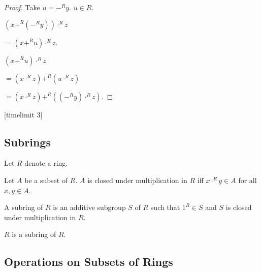 \documentclass[11pt]{article}
\begin{document}
\begin{forthel}
\begin{proof} 
Take $u = -^{R} y$. $u \in R$.

$(x +^{R} (-^{R} y)) \cdot^{R} z $

$= (x +^{R} u) \cdot^{R} z $.

$(x +^{R} u) \cdot^{R} z $


$= (x \cdot^{R} z) +^{R} (u \cdot^{R} z)$


$= (x \cdot^{R} z) +^{R} ((-^{R} y) \cdot^{R} z)$.


\end{proof}
[timelimit 3]
\end{forthel}

\subsection{Subrings}
\begin{forthel}

Let $R$ denote a ring. 

\begin{definition} Let $A$ be a subset of $R$. $A$ is closed under
multiplication in $R$ iff $x \cdot^{R} y \in A$ for all $x,y \in A$.
\end{definition}


\begin{definition} A subring of $R$ is an additive subgroup $S$ of $R$ such that
$1^{R} \in S$ and $S$ is closed under multiplication in $R$.
\end{definition}

\begin{lemma} $R$ is a subring of $R$. \end{lemma}

\end{forthel}

\subsection{Operations on Subsets of Rings}
\renewcommand{\ast}{\cdot}
\renewcommand{\star}{\ }
\end{document}
